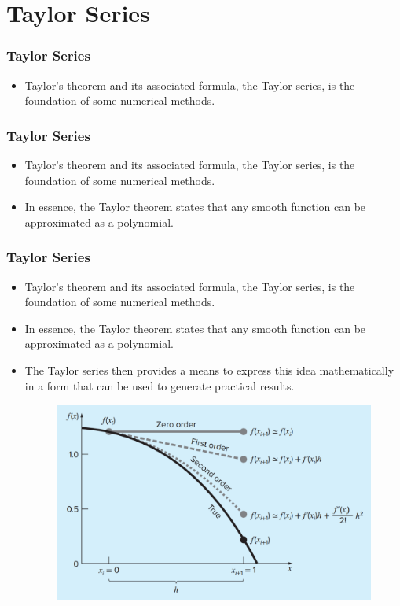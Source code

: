 \documentclass{if-beamer}
\begin{document}
\section{Taylor Series}
\begin{frame}[t]
	\frametitle{Taylor Series}
	\begin{itemize}
		\item Taylor’s theorem and its associated formula, the Taylor series, is the foundation of some numerical methods. 
	\end{itemize}	
\end{frame}

\begin{frame}[t]
	\frametitle{Taylor Series}
	\begin{itemize}
		\item Taylor’s theorem and its associated formula, the Taylor series, is the foundation of some numerical methods. 
		\item In essence, the Taylor theorem states that any smooth function can
		be approximated as a polynomial.
	\end{itemize}	
\end{frame}

\begin{frame}[t]
	\frametitle{Taylor Series}
	\begin{itemize}
		\item Taylor’s theorem and its associated formula, the Taylor series, is the foundation of some numerical methods. 
		\item In essence, the Taylor theorem states that any smooth function can
		be approximated as a polynomial.
		\item The Taylor series then provides a means to express this
		idea mathematically in a form that can be used to generate practical results.
		\begin{figure}
			\centering
			\includegraphics[width = .6\textwidth]{figures/figure2}
		\end{figure}
	\end{itemize}	
\end{frame}
\end{document}
